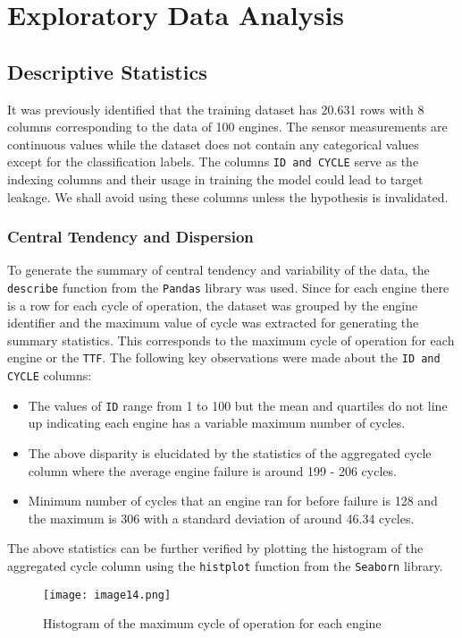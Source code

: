 \documentclass{article}
\begin{document}
\section{Exploratory Data Analysis}
\subsection{Descriptive Statistics}
It was previously identified that the training dataset has \num{20,631} rows with 8 columns corresponding to the data of 100 engines. The sensor measurements are continuous values while the dataset does not contain any categorical values except for the classification labels.
The columns \texttt{ID and CYCLE} serve as the indexing columns and their usage in training the model could lead to target leakage. We shall avoid using these columns unless the hypothesis is invalidated.

\subsubsection{Central Tendency and Dispersion}
To generate the summary of central tendency and variability of the data, the \texttt{describe} function from the \texttt{Pandas} library was used.
Since for each engine there is a row for each cycle of operation, the dataset was grouped by the engine identifier and the maximum value of cycle was extracted for generating the summary statistics. This corresponds to the maximum cycle of operation for each engine or the \texttt{TTF}.
The following key observations were made about the \texttt{ID and CYCLE} columns:
\begin{itemize}[topsep=0pt]
	\item The values of \texttt{ID} range from 1 to 100 but the mean and quartiles do not line up indicating each engine has a variable maximum number of cycles.
	\item The above disparity is elucidated by the statistics of the aggregated cycle column where the average engine failure is around 199 - 206 cycles.
	\item Minimum number of cycles that an engine ran for before failure is 128 and the maximum is 306 with a standard deviation of around 46.34 cycles.
\end{itemize}
The above statistics can be further verified by plotting the histogram of the aggregated cycle column using the \texttt{histplot} function from the \texttt{Seaborn} library.
\begin{figure}[h]
	\centering
	\texttt{[image: image14.png]}
	\caption{Histogram of the maximum cycle of operation for each engine}
\end{figure}
\end{document}
